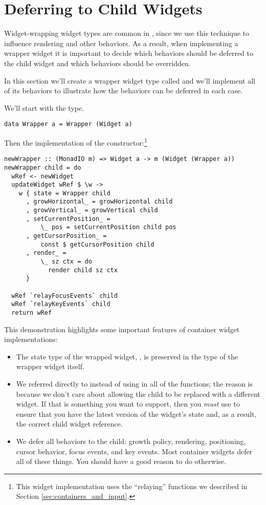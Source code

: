 \section{Deferring to Child Widgets}
\label{sec:deferring}

Widget-wrapping widget types are common in , since we use
this technique to influence rendering and other behaviors.  As a
result, when implementing a wrapper widget it is important to decide
which behaviors should be deferred to the child widget and which
behaviors should be overridden.

In this section we'll create a wrapper widget type called 
and we'll implement all of its behaviors to illustrate how the
behaviors can be deferred in each case.

We'll start with the type.

\begin{verbatim}
data Wrapper a = Wrapper (Widget a)
\end{verbatim}

Then the implementation of the constructor:\footnote{This widget
  implementation uses the ``relaying'' functions we described in
  Section \ref{sec:containers_and_input}.}

\begin{verbatim}
newWrapper :: (MonadIO m) => Widget a -> m (Widget (Wrapper a))
newWrapper child = do
  wRef <- newWidget
  updateWidget wRef $ \w ->
    w { state = Wrapper child
      , growHorizontal_ = growHorizontal child
      , growVertical_ = growVertical child
      , setCurrentPosition_ =
          \_ pos = setCurrentPosition child pos
      , getCursorPosition_ =
          const $ getCursorPosition child
      , render_ =
          \_ sz ctx = do
            render child sz ctx
      }

  wRef `relayFocusEvents` child
  wRef `relayKeyEvents` child
  return wRef
\end{verbatim}

This demonstration highlights some important features of container
widget implementations:

\begin{itemize}
\item The state type of the wrapped widget, , is preserved in
  the type of the wrapper widget itself.
\item We referred directly to  instead of using
   in all of the functions; the reason is because we
  don't care about allowing the child to be replaced with a different
  widget.  If that is something you want to support, then you
  \textit{must} use  to ensure that you have the latest
  version of the widget's state and, as a result, the correct child
  widget reference.
\item We defer all behaviors to the child: growth policy, rendering,
  positioning, cursor behavior, focus events, and key events.  Most
  container widgets defer all of these things.  You should have a good
  reason to do otherwise.
\end{itemize}

